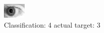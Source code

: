\begin{figure}[h!]
\begin{center}
\includegraphics[width=0.60\columnwidth]{figures/ID296_class_4_target_3.png}
\end{center}
\caption{ Classification: 4 actual target: 3}
\label{fig:ID296_class_4_target_3}
\end{figure}
